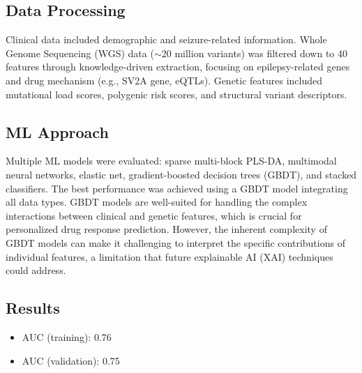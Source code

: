 \subsection*{Data Processing}
Clinical data included demographic and seizure-related information. Whole Genome Sequencing (WGS) data ($\sim$20 million variants) was filtered down to 40 features through knowledge-driven extraction, focusing on epilepsy-related genes and drug mechanism (e.g., SV2A gene, eQTLs). Genetic features included mutational load scores, polygenic risk scores, and structural variant descriptors.

\subsection*{ML Approach}
Multiple ML models were evaluated: sparse multi-block PLS-DA, multimodal neural networks, elastic net, gradient-boosted decision trees (GBDT), and stacked classifiers. The best performance was achieved using a GBDT model integrating all data types. GBDT models are well-suited for handling the complex interactions between clinical and genetic features, which is crucial for personalized drug response prediction. However, the inherent complexity of GBDT models can make it challenging to interpret the specific contributions of individual features, a limitation that future explainable AI (XAI) techniques could address.

\subsection*{Results}
\begin{itemize}
    \item AUC (training): 0.76
    \item AUC (validation): 0.75
\end{itemize}

